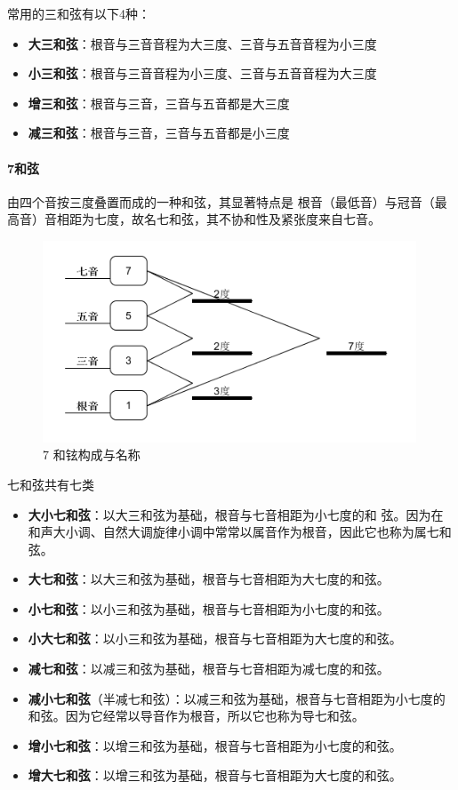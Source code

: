 \documentclass[UTF8,a4paper,12pt]{ctexbook}
\begin{document}
				常用的三和弦有以下4种：
				\begin{itemize}[itemindent = 1em]
					\item \textbf{大三和弦}：根音与三音音程为大三度、三音与五音音程为小三度
					\item \textbf{小三和弦}：根音与三音音程为小三度、三音与五音音程为大三度
					\item \textbf{增三和弦}：根音与三音，三音与五音都是大三度
					\item \textbf{减三和弦}：根音与三音，三音与五音都是小三度
				\end{itemize}
			
			
			\paragraph{7和弦}
				由四个音按三度叠置而成的一种和弦，其显著特点是 根音（最低音）与冠音（最高音）音相距为七度，故名七和弦，其不协和性及紧张度来自七音。
				
				\begin{figure}[H]
					\centering
					\includegraphics[height=6cm]{7hexian}
					\caption{7 和铉构成与名称}
				\end{figure}
				
				七和弦共有七类
				\begin{itemize}[itemindent = 1em]
					\item \textbf{大小七和弦}：以大三和弦为基础，根音与七音相距为小七度的和 弦。因为在和声大小调、自然大调旋律小调中常常以属音作为根音，因此它也称为属七和弦。
					\item \textbf{大七和弦}：以大三和弦为基础，根音与七音相距为大七度的和弦。
					\item \textbf{小七和弦}：以小三和弦为基础，根音与七音相距为小七度的和弦。
					\item \textbf{小大七和弦}：以小三和弦为基础，根音与七音相距为大七度的和弦。
					\item \textbf{减七和弦}：以减三和弦为基础，根音与七音相距为减七度的和弦。
					\item \textbf{减小七和弦}（半减七和弦）：以减三和弦为基础，根音与七音相距为小七度的和弦。因为它经常以导音作为根音，所以它也称为导七和弦。
					\item \textbf{增小七和弦}：以增三和弦为基础，根音与七音相距为小七度的和弦。
					\item \textbf{增大七和弦}：以增三和弦为基础，根音与七音相距为大七度的和弦。
				\end{itemize}
			
\end{document}
